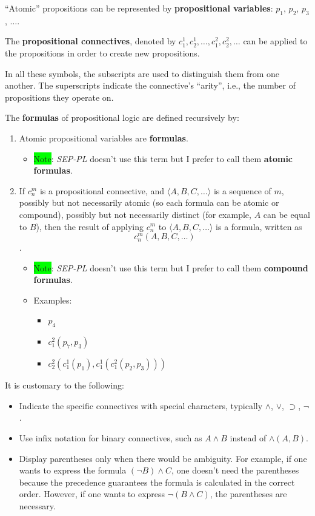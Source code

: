 \documentclass[12pt, letterpaper]{article}
\begin{document}
``Atomic'' propositions can be represented by \textbf{propositional variables}:
$p_1$, $p_2$, $p_3$, $\ldots$.

The \textbf{propositional connectives}, denoted by $c_1^1, c_2^1, \ldots, c_1^2,
c_2^2, \ldots$ can be applied to the propositions in order to create new
propositions.

In all these symbols, the subscripts are used to distinguish them from one
another. The superscripts indicate the connective's ``arity'', i.e., the number
of propositions they operate on.

The \textbf{formulas} of propositional logic are defined recursively by:
\begin{enumerate}
  \item Atomic propositional variables are \textbf{formulas}.
  \begin{itemize}
    \item \colorbox{lime}{Note}: \textit{SEP-PL} doesn't use this term but I prefer
    to call them \textbf{atomic formulas}.
  \end{itemize}

  \item If $c_n^m$ is a propositional connective, and $\langle A, B, C, \ldots
    \rangle$ is a sequence of $m$, possibly but not necessarily atomic (so each
    formula can be atomic or compound), possibly but not necessarily distinct
    (for example, $A$ can be equal to $B$), then the result of applying $c_n^m$
    to $\langle A, B, C, \ldots \rangle$ is a formula, written as \[c_n^m(A, B,
    C, \ldots)\].
    \begin{itemize}
      \item \colorbox{lime}{Note}: \textit{SEP-PL} doesn't use this term but I
        prefer to call them \textbf{compound formulas}.
      \item Examples:
      \begin{itemize}
        \item $p_4$
        \item $c_1^2(p_7, p_3)$
        \item $c_2^2(c_1^1(p_1), c_1^1(c_1^2(p_2, p_3)))$
      \end{itemize}
    \end{itemize}
\end{enumerate}

It is customary to the following:
\begin{itemize}
  \item Indicate the specific connectives with special characters, typically
    $\land$, $\lor$, $\supset$, $\lnot$.
  \item Use infix notation for binary connectives, such as $A \land B$ instead
    of $\land(A, B)$.
  \item Display parentheses only when there would be ambiguity. For example,
    if one wants to express the formula $(\lnot B) \land C$, one doesn't need
    the parentheses because the precedence guarantees the formula is calculated
    in the correct order. However, if one wants to express $\lnot (B \land C)$,
    the parentheses are necessary.
\end{itemize}
\end{document}
